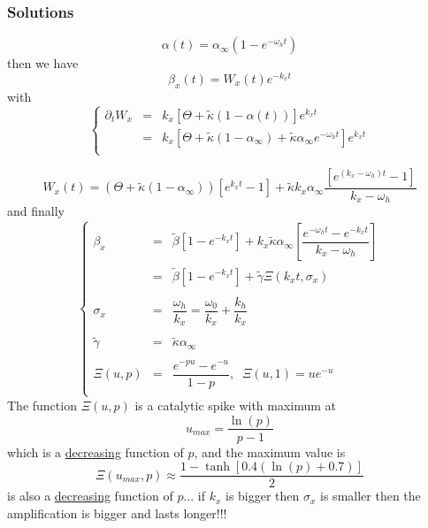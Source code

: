 \documentclass[aps,onecolumn,12pt]{revtex4}
\begin{document}
\subsubsection{Solutions}

\begin{equation}
	\alpha(t) = \alpha_\infty \left(1-e^{-\omega_ht}\right)
\end{equation}
then we have
\begin{equation}
	\beta_x(t) = W_x(t) e^{-k_x t }
\end{equation}
with
\begin{equation}
\left \lbrace
\begin{array}{rcl}
	\partial_tW_x & = & k_x \left[ \Theta + \tilde\kappa(1-\alpha(t)) \right] e^{k_x t} \\
	& = & k_x \left[ \Theta + \tilde\kappa(1-\alpha_\infty) + \tilde\kappa\alpha_\infty e^{-\omega_h t} \right] e^{k_x t} \\
\end{array}
\right.
\end{equation}
	
\begin{equation}
		W_x(t) = \left(\Theta+\tilde\kappa(1-\alpha_\infty)\right) \left[e^{k_x t}-1\right]
		+ \tilde\kappa k_x \alpha_\infty \dfrac{\left[e^{\left(k_x -\omega_h\right) t}-1\right]}{k_x-\omega_h}
\end{equation}	
and finally
\begin{equation}
\left\lbrace
\begin{array}{rcl}
	\beta_x & = & \tilde\beta \left[1-e^{-k_x t}\right] 
	+ k_x \tilde\kappa \alpha_\infty
	\left[
	 \dfrac{
	 e^{-\omega_h t} - e^{-k_x t}
	 }
	 {k_x-\omega_h}
	 \right]\\
	 & = & \tilde\beta \left[1-e^{-k_x  t}\right] + \tilde\gamma \Xi\left(k_x t,\sigma_x\right)\\
	 \\
	 \sigma_x & = & \dfrac{\omega_h}{k_x} = \dfrac{\omega_0}{k_x} + \dfrac{k_h}{k_x} \\
	 \\
	 \tilde\gamma & = & \tilde\kappa \alpha_\infty \\
	 \\
	 \Xi\left(u,p\right) & = & \dfrac{e^{-pu}-e^{-u}}{1-p},\;\;\Xi(u,1)=ue^{-u}\\
\end{array}
\right.
\end{equation}
The function $\Xi\left(u,p\right)$ is a catalytic spike with maximum at 
\begin{equation}
	u_{max} = \dfrac{\ln(p)}{p-1}
\end{equation}
which is a \underline{decreasing} function of $p$, and the maximum value is
\begin{equation}
	\Xi\left(u_{max},p\right) \approx \dfrac{1-\tanh\left[ 0.4(\ln(p)+0.7)\right]}{2}
\end{equation}
is also a \underline{decreasing} function of $p$...
if $k_x$ is bigger then $\sigma_x$ is smaller then the amplification is bigger and lasts longer!!!
\end{document}
